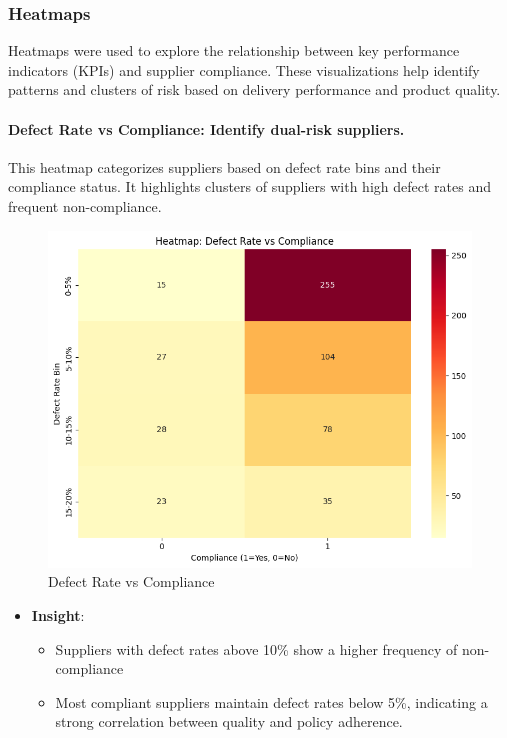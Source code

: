 \documentclass[10pt, twocolumn]{article}
\begin{document}
\subsubsection{Heatmaps} 
Heatmaps were used to explore the relationship between key performance indicators (KPIs) and supplier compliance. These visualizations help identify patterns and clusters of risk based on delivery performance and product quality.

\paragraph{Defect Rate vs Compliance: Identify dual-risk suppliers.}
This heatmap categorizes suppliers based on defect rate bins and their compliance status. It highlights clusters of suppliers with high defect rates and frequent non-compliance.
\begin{figure}[H]
    \centering
    \includegraphics[width=1\linewidth]{Images/heatmap_defect_vs_compliance.png}
    \caption{Defect Rate vs Compliance}
    \label{fig:heatmap_defect_vs_compliance}
\end{figure}
\begin{itemize}    
    \item \textbf{Insight}:
    \begin{itemize}
        \item Suppliers with defect rates above 10\% show a higher frequency of non-compliance
        \item Most compliant suppliers maintain defect rates below 5\%, indicating a strong correlation between quality and policy adherence.
    \end{itemize}
\end{itemize}
\end{document}
